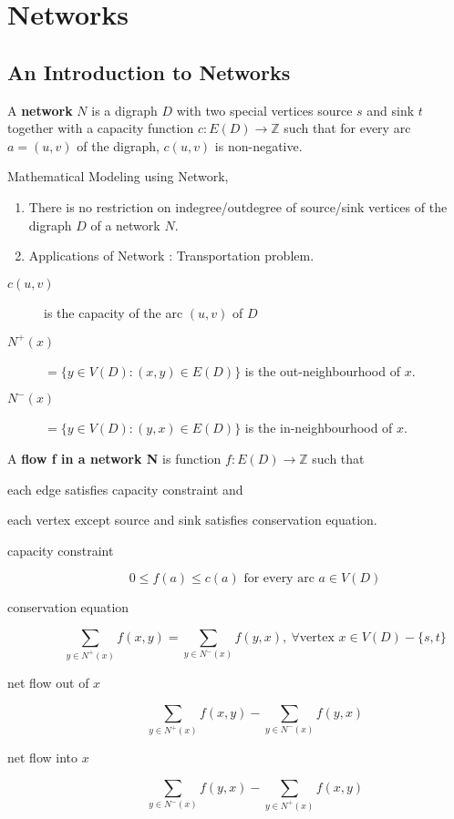 \section{Networks}
\subsection{An Introduction to Networks}
\begin{definition}
	A \textbf{network} $N$ is a digraph $D$ with two special vertices source $s$ and sink $t$ together with a capacity function $c : E(D) \to \mathbb{Z}$ such that for every arc $a = (u,v)$ of the digraph, $c(u,v)$ is non-negative.
\end{definition}

\begin{remark} Mathematical Modeling using Network,
	\begin{enumerate}
		\item There is no restriction on indegree/outdegree of source/sink vertices of the digraph $D$ of a network $N$.
		\item Applications of Network : Transportation problem.
	\end{enumerate}
\end{remark}

\begin{description}
	\item[$c(u,v)$] is the capacity of the arc $(u,v)$ of $D$
	\item[$N^+(x)$] $= \{ y \in V(D) : (x,y) \in E(D)\}$ is the out-neighbourhood of $x$.
	\item[$N^-(x)$] $= \{ y \in V(D) : (y,x) \in E(D)\}$ is the in-neighbourhood of $x$.
\end{description}

\begin{definition}
	A \textbf{flow f in a network N} is function $f : E(D) \to \mathbb{Z}$ such that
	\begin{enumerate*}
		\item each edge satisfies capacity constraint and
		\item each vertex except source and sink satisfies conservation equation.
	\end{enumerate*}
\end{definition}

\begin{description}
	\item[capacity constraint] 
		\begin{equation}
		0 \le f(a) \le c(a) \text{ for every arc }a \in V(D)
		\end{equation}
	\item[conservation equation] 
		\begin{equation}
			\sum_{y \in N^+(x)} f(x,y) = \sum_{y \in N^-(x)} f(y,x),\ \forall \text{vertex } x \in V(D)-\{s,t\}
		\label{equ:conservation}
		\end{equation}
	\item[net flow out of $x$]
		\[ \sum_{y \in N^+(x)} f(x,y) - \sum_{y \in N^-(x)} f(y,x) \]
	\item[net flow into $x$]
		\[ \sum_{y \in N^-(x)} f(y,x) - \sum_{y \in N^+(x)} f(x,y) \]
\end{description}

